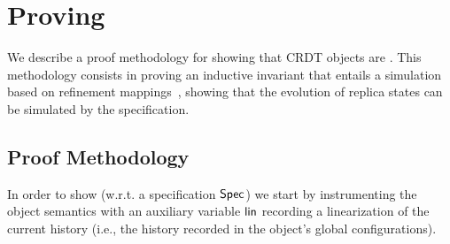 \section{Proving \CRDTLin{}}
\label{sec:proofs}

We describe a proof methodology for showing that CRDT objects are
\crdtlinearizable{}.
This methodology consists in proving an inductive invariant that
entails a simulation based on refinement
mappings~\cite{AbadiL91,DBLP:journals/iandc/LynchV95}, showing that
the evolution of replica states can be simulated by the specification.

\subsection{Proof Methodology}\label{ssec:proof-methodology}

In order to show \crdtlin{} (w.r.t. a specification $\mathsf{Spec}{}$) we start by
instrumenting the object semantics with an auxiliary variable
$\mathsf{lin}$ recording a linearization of the current history (i.e., the history recorded
in the object's global configurations). 

